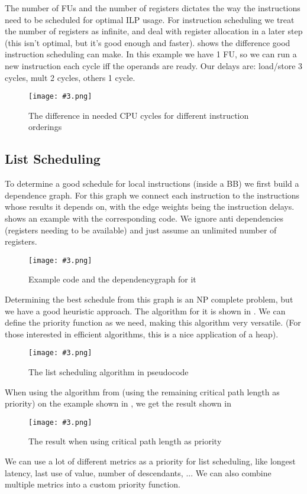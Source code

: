 \documentclass{article}
\newcommand{\fig}[4]{
	\begin{figure}[#1]
		\center
		\texttt{[image: \#3.png]}
		\caption{#4}
		\label{fig:#3}
	\end{figure}
	}
\begin{document}
The number of FUs and the number of registers dictates the way the instructions need to be scheduled for optimal ILP usage.
For instruction scheduling we treat the number of registers as infinite, and deal with register allocation in a later step (this isn't optimal, but it's good enough and faster).
 shows the difference good instruction scheduling can make.
In this example we have 1 FU, so we can run a new instruction each cycle iff the operands are ready.
Our delays are: load/store 3 cycles, mult 2 cycles, others 1 cycle.

\fig{h}{}{superscalar}{The difference in needed CPU cycles for different instruction orderings}

\subsection{List Scheduling}
To determine a good schedule for local instructions (inside a BB) we first build a dependence graph.
For this graph we connect each instruction to the instructions whose results it depends on, with the edge weights being the instruction delays.
 shows an example with the corresponding code.
We ignore anti dependencies (registers needing to be available) and just assume an unlimited number of registers.

\fig{h}{}{dependencygraph}{Example code and the dependencygraph for it}

Determining the best schedule from this graph is an NP complete problem, but we have a good heuristic approach.
The algorithm for it is shown in .
We can define the priority function as we need, making this algorithm very versatile.
(For those interested in efficient algorithms, this is a nice application of a heap).

\fig{h}{}{listscheduling}{The list scheduling algorithm in pseudocode}

When using the algorithm from  (using the remaining critical path length as priority) on the example shown in , we get the result shown in 

\fig{h}{}{scheduleresult}{The result when using critical path length as priority}

We can use a lot of different metrics as a priority for list scheduling, like longest latency, last use of value, number of descendants, ...
We can also combine multiple metrics into a custom priority function.
\end{document}
